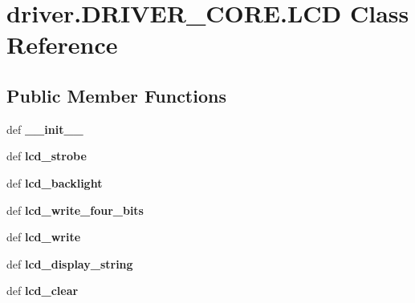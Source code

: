 \hypertarget{classdriver_1_1DRIVER__CORE_1_1LCD}{}\section{driver.\+D\+R\+I\+V\+E\+R\+\_\+\+C\+O\+R\+E.\+L\+C\+D Class Reference}
\label{classdriver_1_1DRIVER__CORE_1_1LCD}
\subsection*{Public Member Functions}
\begin{DoxyCompactItemize}
\item 
\hypertarget{classdriver_1_1DRIVER__CORE_1_1LCD_a42d8dfae2030675de36c798311a4c081}{}def {\bfseries \+\_\+\+\_\+init\+\_\+\+\_\+}\label{classdriver_1_1DRIVER__CORE_1_1LCD_a42d8dfae2030675de36c798311a4c081}

\item 
\hypertarget{classdriver_1_1DRIVER__CORE_1_1LCD_adb4ade1f425d0a6e2381d0867ee1b28e}{}def {\bfseries lcd\+\_\+strobe}\label{classdriver_1_1DRIVER__CORE_1_1LCD_adb4ade1f425d0a6e2381d0867ee1b28e}

\item 
\hypertarget{classdriver_1_1DRIVER__CORE_1_1LCD_a8e3c81f32062f6696ab645b4c3b5ef04}{}def {\bfseries lcd\+\_\+backlight}\label{classdriver_1_1DRIVER__CORE_1_1LCD_a8e3c81f32062f6696ab645b4c3b5ef04}

\item 
\hypertarget{classdriver_1_1DRIVER__CORE_1_1LCD_a68e940af4dc6aa7e973d87b4f2aab36e}{}def {\bfseries lcd\+\_\+write\+\_\+four\+\_\+bits}\label{classdriver_1_1DRIVER__CORE_1_1LCD_a68e940af4dc6aa7e973d87b4f2aab36e}

\item 
\hypertarget{classdriver_1_1DRIVER__CORE_1_1LCD_ab58cedfbef364410e3eb958a2af041fd}{}def {\bfseries lcd\+\_\+write}\label{classdriver_1_1DRIVER__CORE_1_1LCD_ab58cedfbef364410e3eb958a2af041fd}

\item 
\hypertarget{classdriver_1_1DRIVER__CORE_1_1LCD_a164b4819a2e592ae683f4db5902d88f2}{}def {\bfseries lcd\+\_\+display\+\_\+string}\label{classdriver_1_1DRIVER__CORE_1_1LCD_a164b4819a2e592ae683f4db5902d88f2}

\item 
\hypertarget{classdriver_1_1DRIVER__CORE_1_1LCD_a3242b603d9dd21803d4283e714d76c1e}{}def {\bfseries lcd\+\_\+clear}\label{classdriver_1_1DRIVER__CORE_1_1LCD_a3242b603d9dd21803d4283e714d76c1e}

\end{DoxyCompactItemize}
